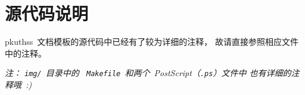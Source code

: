\chapter{源代码说明}

pkuthss~文档模板的源代码中已经有了较为详细的注释，
故请直接参照相应文件中的注释。

\emph
{%
	注：%
	\texttt{img/}~目录中的~%
	\texttt{Makefile}~和两个~PostScript（\texttt{.ps}）文件中%
	也有详细的注释哦~:)
}

